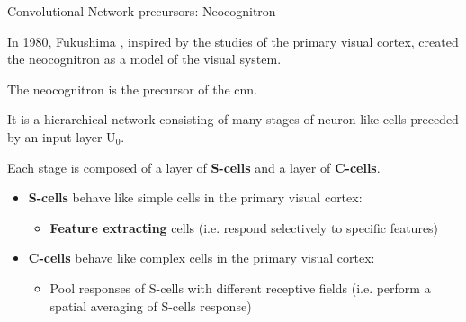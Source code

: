 %
%
%

\begin{frame}[t,allowframebreaks]{Convolutional Network precursors: Neocognitron -}

    In 1980, \gls{Fukushima} 
    \cite{Fukushima:1980nc, Fukushima:1988nc, Fukushima:2019nc}, 
    inspired by the studies of the \gls{primary visual cortex},
    created the \gls{neocognitron}
    as a model of the visual system.\\
    \vspace{0.2cm}

    The \gls{neocognitron} is the precursor of the \gls{cnn}.\\
    \vspace{0.2cm}

    It is a hierarchical network consisting of many 
    stages of \gls{neuron}-like cells
    preceded by an input layer U$_0$.\\
    \vspace{0.2cm}

    Each stage is composed of a layer of 
    {\bf S-cells} and a layer of {\bf C-cells}.
    \vspace{0.2cm}

    \begin{itemize}
        \item
        {\bf S-cells} behave like 
        \glspl{simple cell} in the 
        \gls{primary visual cortex}: 
        \begin{itemize}
            \item
            {\bf Feature extracting} cells 
            (i.e. respond selectively to specific features)
        \end{itemize}
        \item
        {\bf C-cells} behave like 
        \glspl{complex cell} in the 
        \gls{primary visual cortex}:
        \begin{itemize}
            \item Pool responses of S-cells with 
            different receptive fields 
            (i.e. perform a spatial averaging of S-cells response)\\
        \end{itemize}
    \end{itemize}
    \vspace{0.2cm}

    \framebreak


\end{frame}
